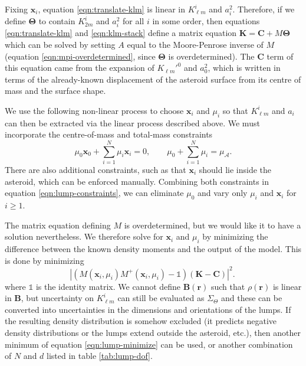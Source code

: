 Fixing $\bm x_i$, equation \ref{eqn:translate-klm} is linear in $K_{\ell m}^i$ and $a_i^2$. Therefore, if we define $\bm \Theta$ to contain $K_{2m}^i$ and $a_i^2$ for all $i$ in some order, then equations \ref{eqn:translate-klm} and \ref{eqn:klm-stack} define a matrix equation $\bm K = \bm C + M \bm \Theta$ which can be solved by setting $A$ equal to the Moore-Penrose inverse of $M$ (equation \ref{eqn:mpi-overdetermined}, since $\bm \Theta$ is overdetermined). The $\bm C$ term of this equation came from the expansion of $K_{\ell m}'^0$ and $a_0^2$, which is written in terms of the already-known displacement of the asteroid surface from its centre of mass and the surface shape.

We use the following non-linear process to choose $\bm x_i$ and $\mu_i$ so that $K_{\ell m}^i$ and $a_i$ can then be extracted via the linear process described above. We must incorporate the centre-of-mass and total-mass constraints
\begin{equation}
  \mu_0 \bm x_0 + \sum_{i=1}^N \mu_i \bm x_i = 0, \qquad \mu_0 + \sum_{i=1}^N \mu_i = \mu_\mathcal{A}.
  \label{eqn:lump-constraints}
\end{equation}
There are also additional constraints, such as that $\bm x_i$ should lie inside the asteroid, which can be enforced manually. Combining both constraints in equation \ref{eqn:lump-constraints}, we can eliminate $\mu_0$ and vary only $\mu_i$ and $\bm x_i$ for $i \geq 1$.

The matrix equation defining $M$ is overdetermined, but we would like it to have a solution nevertheless. We therefore solve for $\bm x_i$ and $\mu_i$ by minimizing the difference between the known density moments and the output of the model. This is done by minimizing
\begin{equation}
  |(M(\bm x_i, \mu_i) M^+(\bm x_i, \mu_i) - \mathds{1}) (\bm K - \bm C)|^2.\
  \label{eqn:lump-minimize}
\end{equation}
where $\mathds{1}$ is the identity matrix. We cannot define $\bm B(\bm r)$ such that $\rho(\bm r)$ is linear in $\bm B$, but uncertainty on $K_{\ell m}^i$ can still be evaluated as $\Sigma_\Theta$ and these can be converted into uncertainties in the dimensions and orientations of the lumps. If the resulting density distribution is somehow excluded (it predicts negative density distributions or the lumps extend outside the asteroid, etc.), then another minimum of equation \ref{eqn:lump-minimize} can be used, or another combination of $N$ and $d$ listed in table \ref{tab:lump-dof}.

